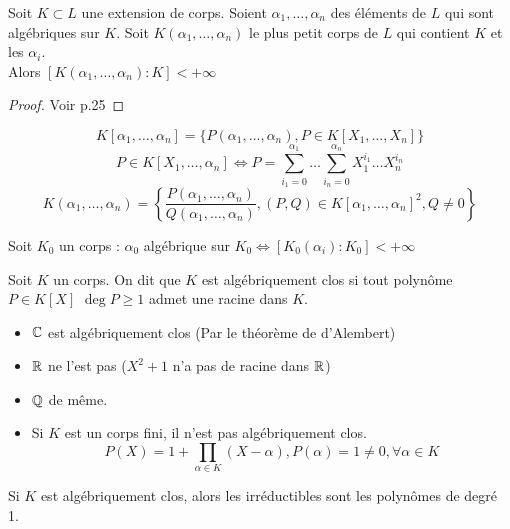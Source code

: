 \documentclass[]{report}
\begin{document}
    \begin{prop}{}{}
        Soit $K\subset L$ une extension de corps. Soient $\alpha_1,\dots,\alpha_n$ des éléments de $L$ qui sont algébriques sur $K$. Soit $K(\alpha_1,\dots,\alpha_n)$ le plus petit corps de $L$ qui contient $K$ et les $\alpha_i$. \\
        Alors $[K(\alpha_1,\dots,\alpha_n):K]<+\infty$
    \end{prop}

    \begin{proof}
        Voir p.25
    \end{proof}

    \begin{re}{}{}
        \[K[\alpha_1,\dots,\alpha_n]=\{P(\alpha_1,\dots,\alpha_n),P\in K[X_1,\dots,X_n]\}\]
        \[P\in K[X_1,\dots,\alpha_n]\iff P=\sum_{i_1=0}^{\alpha_1}\dots\sum_{i_n=0}^{\alpha_n}X_1^{i_1}\dots X_n^{i_n}\]
        \[K(\alpha_1,\dots,\alpha_n)=\left\{\frac{P(\alpha_1,\dots,\alpha_n)}{Q(\alpha_1,\dots,\alpha_n)},(P,Q)\in K[\alpha_1,\dots,\alpha_n]^2,Q\neq 0\right\}\]
    \end{re}

    \begin{ra}{}{}
        Soit $K_0$ un corps : $\alpha_0$ algébrique sur $K_0\iff [K_0(\alpha_i):K_0]<+\infty$
    \end{ra}

    \begin{df}{}{}
        Soit $K$ un corps. On dit que $K$ est algébriquement clos si tout polynôme $P\in K[X]$ \tq $\deg P\ge1$ admet une racine dans $K$.
    \end{df}

    \begin{ex}{}{}
        \begin{itemize}
            \item $\mathbb{C}$ est algébriquement clos (Par le théorème de d'Alembert)
            \item $\mathbb{R}$ ne l'est pas ($X^2+1$ n'a pas de racine dans $\mathbb{R}$)
            \item $\mathbb{Q}$ de même.
            \item Si $K$ est un corps fini, il n'est pas algébriquement clos.
            $$P(X)=1+\prod_{\alpha\in K}(X-\alpha),P(\alpha)=1\neq 0, \forall \alpha \in K$$
        \end{itemize}
    \end{ex}

    \begin{lm}{}{}
        Si $K$ est algébriquement clos, alors les irréductibles sont les polynômes de degré 1.
    \end{lm}
\end{document}
